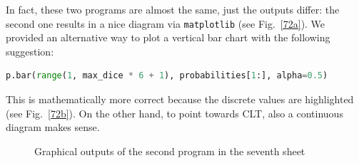 \documentclass[]{interact}
\theoremstyle{plain}%
\theoremstyle{definition}
\theoremstyle{remark}
\begin{document}
In fact, these two programs are almost the same, just the outputs differ: the second
one results in a nice diagram via \texttt{matplotlib} (see Fig.~\ref{72a}). We provided an alternative
way to plot a vertical bar chart with the following suggestion:
\begin{lstlisting}[language=Python,firstnumber=10]
  p.bar(range(1, max_dice * 6 + 1), probabilities[1:], alpha=0.5)
\end{lstlisting}
This is mathematically more correct because the discrete values are highlighted
(see Fig.~\ref{72b}).
On the other hand, to point towards CLT, also a continuous diagram makes sense.

\begin{figure}
\centering
{}\hspace{5pt}
\caption{Graphical outputs of the second program in the seventh sheet} \label{sample-figure}
\end{figure}
\end{document}
